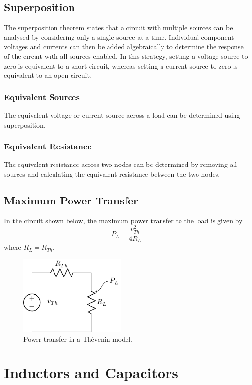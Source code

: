 \documentclass{article}
\begin{document}
\subsection{Superposition}
The superposition theorem states that a circuit with multiple sources
can be analysed by considering only a single source at a time.
Individual component voltages and currents can then be added
algebraically to determine the response of the circuit with all sources
enabled. In this strategy, setting a voltage source to zero is
equivalent to a short circuit, whereas setting a current source to zero
is equivalent to an open circuit.
\subsubsection{Equivalent Sources}
The equivalent voltage or current source across a load can be
determined using superposition.
\subsubsection{Equivalent Resistance}
The equivalent resistance across two nodes can be determined by
removing all sources and calculating the equivalent resistance between
the two nodes.
\subsection{Maximum Power Transfer}
In the circuit shown below, the maximum power transfer to the load is
given by
\begin{equation*}
    P_L = \frac{v_{Th}^2}{4R_L}
\end{equation*}
where \(R_L = R_{Th}\).
\begin{figure}[H]
    \centering
    \includegraphics[height = 4cm, keepaspectratio = true]{figures/max_power_transfer.pdf}
    \caption{Power transfer in a Thévenin model.}
\end{figure}
\newpage
\section{Inductors and Capacitors}
\end{document}
